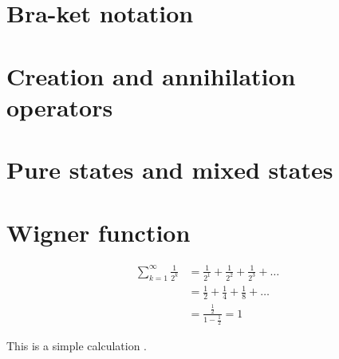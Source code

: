 \documentclass{book}
\begin{document}
\section{Bra-ket notation}
\section{Creation and annihilation operators}
\section{Pure states and mixed states}
\section{Wigner function}

\begin{equation}
\begin{aligned}
  \sum_{k=1}^\infty \frac 1 {2^k} &= \frac 1 {2^1} + \frac 1 {2^2} + \frac 1 {2^3} + \dots \\
  &= \frac{1}{2} + \frac{1}{4} + \frac{1}{8} + \dots \\
  &= \frac{\frac 1 2}{1-\frac 1 2} =  1
\end{aligned}
\end{equation}

This is a simple calculation \cite{adams1995hitchhiker}.

\printindex



\end{document}
